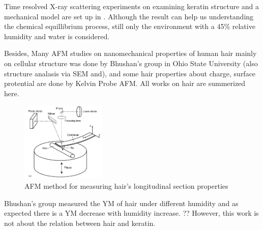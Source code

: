 \documentclass{article}
\begin{document}
Time resolved X-ray scattering experiments on examining keratin structure and a mechanical model are set up in \citep{kreplak2002new}.  Although the result can help us understanding the chemical equillibrium process, still only the environment with a 45\% relative humidity and water is considered.

Besides, Many AFM studies on nanomechanical properties of human hair mainly on cellular structure was done by Bhushan's group in Ohio State University (also structure analasis via SEM and)\citep{bhushan2006afm, seshadri2008situ, wei2005nanomechanical}, and some hair properties about charge, surface protential are done by Kelvin Probe AFM\citep{lodge2007surface, seshadri2008effect}.  All works on hair are summerized here\citep{bhushan2008nanoscale}. 
\begin{figure}[H]
    \centering
    \includegraphics[width=0.36\textwidth]{bhushan.png}
    \caption{AFM method for measuring hair's longitudinal section properties }
\end{figure}
Bhushan's group measured the YM of hair under different humidity and as expected there is a YM decrease with humidity increase. ?? However, this work is not about the relation between hair and keratin. 
\end{document}
